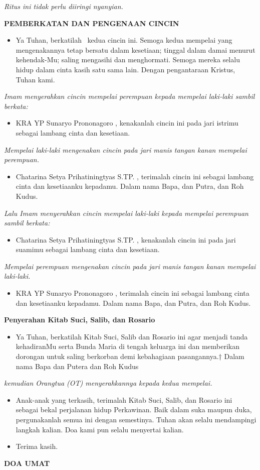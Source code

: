 \documentclass[a5paper,titlepage,11pt,openany]{scrbook}
\makeatletter
\newcommand{\subjudul}[1]{%
  {\parindent \z@ 
    \interlinepenalty\@M \large \bfseries #1\par\nobreak \vskip 10\p@ }}
\newcommand{\subsubjudul}[1]{%
  {\parindent \z@ 
    \interlinepenalty\@M \bfseries #1\par\nobreak \vskip 10\p@ }}
\newcommand{\BI}[1]{\begin{itemize} \item[I:] #1 \end{itemize}}
\newcommand{\BPL}[1]{\begin{itemize} \item[Naryo:] #1 \end{itemize}}
\newcommand{\BPW}[1]{\begin{itemize} \item[Katrin:] #1 \end{itemize}}
\newcommand{\BPLW}[1]{\begin{itemize} \item[N+K:] #1 \end{itemize}}
\newcommand{\BOT}[1]{\begin{itemize} \item[OT:] #1 \end{itemize}}
\newcommand{\camantri}{Chatarina Setya Prihatiningtyas S.TP. }
\newcommand{\camantra}{KRA YP Sunaryo Prononagoro }
\makeatother
\begin{document}
\textit{Ritus ini tidak perlu diiringi nyanyian.}

\subjudul{PEMBERKATAN DAN PENGENAAN CINCIN}
\BI{Ya Tuhan, berkatilah \CrossOpenShadow
 ~kedua cincin ini. Semoga kedua mempelai yang mengenakannya tetap bersatu dalam kesetiaan; tinggal dalam damai menurut kehendak-Mu; saling mengasihi dan menghormati. Semoga mereka selalu hidup dalam cinta kasih satu sama lain. Dengan pengantaraan Kristus, Tuhan kami.}

\textit{Imam menyerahkan cincin mempelai  perempuan kepada mempelai laki-laki sambil berkata:}

\BI{\camantra, kenakanlah cincin ini pada jari istrimu sebagai lambang cinta dan kesetiaan.}

\textit{Mempelai laki-laki mengenakan cincin pada jari manis tangan kanan mempelai perempuan.}

\BPL{\camantri, terimalah cincin ini sebagai lambang cinta dan kesetiaanku kepadamu.
            Dalam nama Bapa, dan Putra, dan Roh Kudus.}

\textit{Lalu Imam menyerahkan cincin mempelai  laki-laki kepada mempelai perempuan sambil berkata:}

\BI{\camantri, kenakanlah cincin ini pada jari suamimu sebagai lambang cinta dan kesetiaan.}

\textit{Mempelai perempuan mengenakan cincin pada jari manis tangan kanan mempelai laki-laki.}

\BPW{\camantra, terimalah cincin ini sebagai lambang cinta dan kesetiaanku kepadamu.
            Dalam nama Bapa, dan Putra, dan Roh Kudus.}



\subsubjudul{Penyerahan Kitab Suci, Salib, dan Rosario}

\BI{Ya Tuhan, berkatilah Kitab Suci, Salib dan Rosario ini agar menjadi tanda kehadiranMu serta Bunda Maria di tengah keluarga ini dan memberikan dorongan untuk saling berkorban demi kebahagiaan
         pasangannya.† Dalam nama Bapa dan Putera dan Roh Kudus}

\textit{kemudian Orangtua (OT) menyerahkannya kepada kedua mempelai.}

\BOT{Anak-anak yang terkasih, terimalah Kitab Suci, Salib, dan Rosario ini sebagai bekal perjalanan hidup Perkawinan. Baik dalam suka maupun duka, pergunakanlah semua ini dengan semestinya. Tuhan akan selalu mendampingi langkah kalian. Doa kami pun selalu menyertai kalian.}
\BPLW{Terima kasih.}
\subjudul{DOA UMAT}
\end{document}
